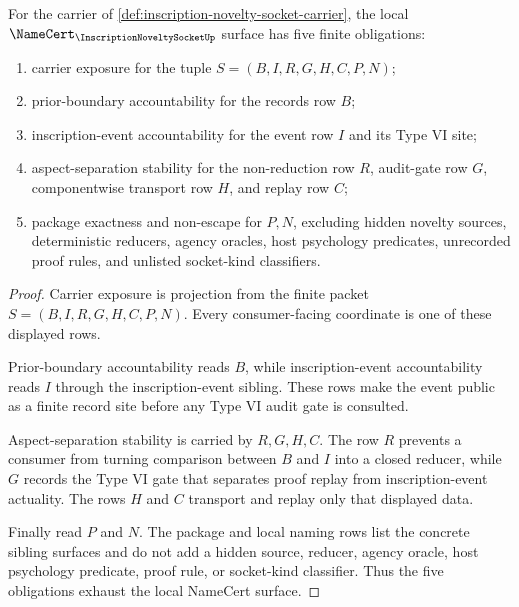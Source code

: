\begin{theorem}
\label{thm:inscription-novelty-socket-namecert-obligations}
For the carrier of \autoref{def:inscription-novelty-socket-carrier}, the local $\NameCert_{\InscriptionNoveltySocketUp}$ surface has five finite obligations:
\begin{enumerate}
\item carrier exposure for the tuple $S=(B,I,R,G,H,C,P,N)$;
\item prior-boundary accountability for the records row $B$;
\item inscription-event accountability for the event row $I$ and its Type VI site;
\item aspect-separation stability for the non-reduction row $R$, audit-gate row $G$, componentwise transport row $H$, and replay row $C$;
\item package exactness and non-escape for $P,N$, excluding hidden novelty sources, deterministic reducers, agency oracles, host psychology predicates, unrecorded proof rules, and unlisted socket-kind classifiers.
\end{enumerate}
\end{theorem}
\begin{proof}
Carrier exposure is projection from the finite packet $S=(B,I,R,G,H,C,P,N)$. Every consumer-facing coordinate is one of these displayed rows.

Prior-boundary accountability reads $B$, while inscription-event accountability reads $I$ through the inscription-event sibling. These rows make the event public as a finite record site before any Type VI audit gate is consulted.

Aspect-separation stability is carried by $R,G,H,C$. The row $R$ prevents a consumer from turning comparison between $B$ and $I$ into a closed reducer, while $G$ records the Type VI gate that separates proof replay from inscription-event actuality. The rows $H$ and $C$ transport and replay only that displayed data.

Finally read $P$ and $N$. The package and local naming rows list the concrete sibling surfaces and do not add a hidden source, reducer, agency oracle, host psychology predicate, proof rule, or socket-kind classifier. Thus the five obligations exhaust the local NameCert surface.
\end{proof}

